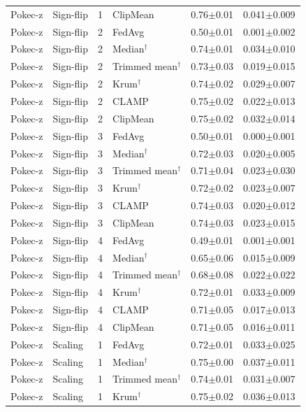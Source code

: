 \begin{longtable}{llclcc}
Pokec-z & Sign-flip & 1 & ClipMean & 0.76$\pm$0.01 & 0.041$\pm$0.009 \\
Pokec-z & Sign-flip & 2 & FedAvg & 0.50$\pm$0.01 & 0.001$\pm$0.002 \\
Pokec-z & Sign-flip & 2 & Median$^\dagger$ & 0.74$\pm$0.01 & 0.034$\pm$0.010 \\
Pokec-z & Sign-flip & 2 & Trimmed mean$^\dagger$ & 0.73$\pm$0.03 & 0.019$\pm$0.015 \\
Pokec-z & Sign-flip & 2 & Krum$^\dagger$ & 0.74$\pm$0.02 & 0.029$\pm$0.007 \\
Pokec-z & Sign-flip & 2 & CLAMP & 0.75$\pm$0.02 & 0.022$\pm$0.013 \\
Pokec-z & Sign-flip & 2 & ClipMean & 0.75$\pm$0.02 & 0.032$\pm$0.014 \\
Pokec-z & Sign-flip & 3 & FedAvg & 0.50$\pm$0.01 & 0.000$\pm$0.001 \\
Pokec-z & Sign-flip & 3 & Median$^\dagger$ & 0.72$\pm$0.03 & 0.020$\pm$0.005 \\
Pokec-z & Sign-flip & 3 & Trimmed mean$^\dagger$ & 0.71$\pm$0.04 & 0.023$\pm$0.030 \\
Pokec-z & Sign-flip & 3 & Krum$^\dagger$ & 0.72$\pm$0.02 & 0.023$\pm$0.007 \\
Pokec-z & Sign-flip & 3 & CLAMP & 0.74$\pm$0.03 & 0.020$\pm$0.012 \\
Pokec-z & Sign-flip & 3 & ClipMean & 0.74$\pm$0.03 & 0.023$\pm$0.015 \\
Pokec-z & Sign-flip & 4 & FedAvg & 0.49$\pm$0.01 & 0.001$\pm$0.001 \\
Pokec-z & Sign-flip & 4 & Median$^\dagger$ & 0.65$\pm$0.06 & 0.015$\pm$0.009 \\
Pokec-z & Sign-flip & 4 & Trimmed mean$^\dagger$ & 0.68$\pm$0.08 & 0.022$\pm$0.022 \\
Pokec-z & Sign-flip & 4 & Krum$^\dagger$ & 0.72$\pm$0.01 & 0.033$\pm$0.009 \\
Pokec-z & Sign-flip & 4 & CLAMP & 0.71$\pm$0.05 & 0.017$\pm$0.013 \\
Pokec-z & Sign-flip & 4 & ClipMean & 0.71$\pm$0.05 & 0.016$\pm$0.011 \\
Pokec-z & Scaling & 1 & FedAvg & 0.72$\pm$0.01 & 0.033$\pm$0.025 \\
Pokec-z & Scaling & 1 & Median$^\dagger$ & 0.75$\pm$0.00 & 0.037$\pm$0.011 \\
Pokec-z & Scaling & 1 & Trimmed mean$^\dagger$ & 0.74$\pm$0.01 & 0.031$\pm$0.007 \\
Pokec-z & Scaling & 1 & Krum$^\dagger$ & 0.75$\pm$0.02 & 0.036$\pm$0.013 \\

\end{longtable}
